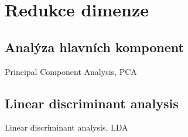 

\chapter{Redukce dimenze}

\section{Analýza hlavních komponent}
\par{Principal Component Analysis, PCA}

\section{Linear discriminant analysis}
\par{Linear discriminant analysis, LDA}